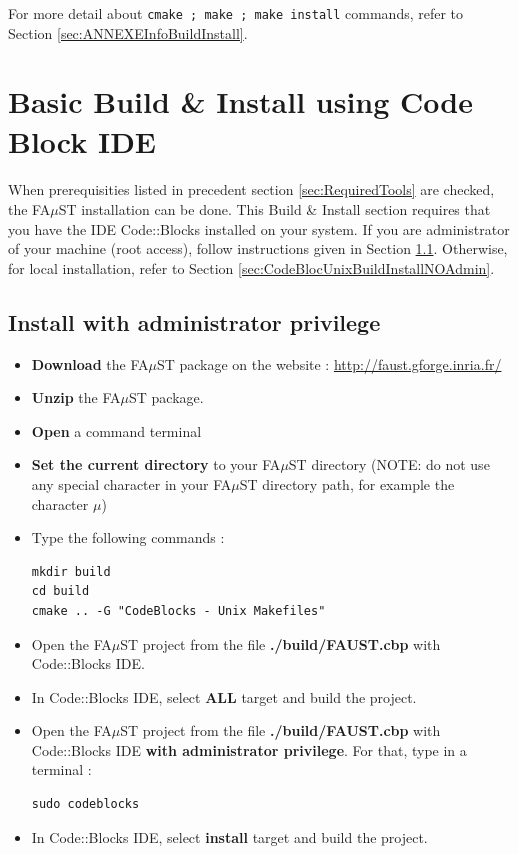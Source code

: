 \begin{itemize}
For more detail about \texttt{cmake ; make ; make install} commands, refer to Section \ref{sec:ANNEXEInfoBuildInstall}.




\section{Basic Build \& Install using Code Block IDE}\label{sec:UnixInstallCodeBlock}
\paragraph{}When prerequisities listed in precedent section \ref{sec:RequiredTools} are checked, the FA$\mu$ST installation can be done. This Build \& Install section requires that you have the IDE Code::Blocks installed on your system. If you are administrator of your machine (root access), follow instructions given in Section \ref{sec:CodeBlocUnixBuildInstallAdmin}. Otherwise, for local installation, refer to Section \ref{sec:CodeBlocUnixBuildInstallNOAdmin}. 

\subsection{Install with administrator privilege}\label{sec:CodeBlocUnixBuildInstallAdmin}
\begin{itemize}
\item \textbf{Download} the FA$\mu$ST package on the website :  \url{http://faust.gforge.inria.fr/}
\item \textbf{Unzip} the FA$\mu$ST package.
\item \textbf{Open} a command terminal
\item \textbf{Set the current directory} to your FA$\mu$ST directory (NOTE: do not use any special character in your FA$\mu$ST directory path, for example the character $\mu$)
\item Type the following commands : 
\begin{lstlisting}
mkdir build
cd build
cmake .. -G "CodeBlocks - Unix Makefiles"
\end{lstlisting}

\item Open the FA$\mu$ST project from the file \textbf{./build/FAUST.cbp} with Code::Blocks IDE. 
\item In Code::Blocks IDE, select \textbf{ALL} target and build the project. 
\item Open the FA$\mu$ST project from the file \textbf{./build/FAUST.cbp} with Code::Blocks IDE \textbf{with administrator privilege}. For that, type in a terminal :
\begin{lstlisting}
sudo codeblocks
\end{lstlisting}
\item In Code::Blocks IDE, select \textbf{install} target and build the project. 
\end{itemize}


\end{itemize}
